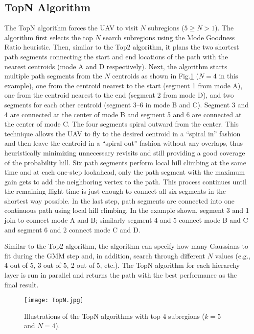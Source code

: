 \documentclass[journal]{IEEEtran}
\begin{document}
\subsection{TopN Algorithm}

The TopN algorithm forces the UAV to visit $N$ subregions ($5\!\geq\!N\!>\!1$). The algorithm first selects the top $N$ search subregions using the Mode Goodness Ratio heuristic. Then, similar to the Top2 algorithm, it plans the two shortest path segments connecting the start and end locations of the path with the nearest centroids (mode A and D respectively). Next, the algorithm starts multiple path segments from the $N$ centroids as shown in Fig.\ref{TopN} ($N=4$ in this example), one from the centroid nearest to the start (segment 1 from mode A), one from the centroid nearest to the end (segment 2 from mode D), and two segments for each other centroid (segment 3--6 in mode B and C). Segment 3 and 4 are connected at the center of mode B and segment 5 and 6 are connected at the center of mode C. The four segments spiral outward from the center. This technique allows the UAV to fly to the desired centroid in a ``spiral in'' fashion and then leave the centroid in a ``spiral out'' fashion without any overlaps, thus heuristically minimizing unnecessary revisits and still providing a good coverage of the probability hill. Six path segments perform local hill climbing at the same time and at each one-step lookahead, only the path segment with the maximum gain gets to add the neighboring vertex to the path. This process continues until the remaining flight time is just enough to connect all six segments in the shortest way possible. In the last step, path segments are connected into one continuous path using local hill climbing. In the example shown, segment 3 and 1 join to connect mode A and B; similarly segment 4 and 5 connect mode B and C and segment 6 and 2 connect mode C and D.

Similar to the Top2 algorithm, the algorithm can specify how many Gaussians to fit during the GMM step and, in addition, search through different $N$ values (e.g., 4 out of 5, 3 out of 5, 2 out of 5, etc.). The TopN algorithm for each hierarchy layer is run in parallel and returns the path with the best performance as the final result.
\begin{figure}
\centering
\texttt{[image: TopN.jpg]}
\caption{Illustrations of the TopN algorithms with top 4 subregions ($k=5$ and $N=4$).}
\label{TopN}
\end{figure}
\end{document}
